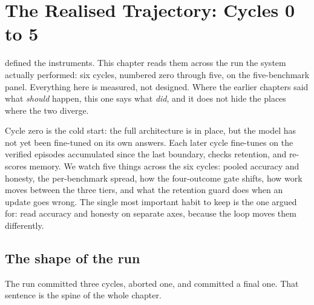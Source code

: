 \chapter{The Realised Trajectory: Cycles 0 to 5}
\label{ch:trajectory}

 defined the instruments. This chapter reads them across the run
the system actually performed: six cycles, numbered zero through five, on the
five-benchmark panel. Everything here is measured, not designed. Where the earlier
chapters said what \emph{should} happen, this one says what \emph{did}, and it does
not hide the places where the two diverge.

\begin{intuition}
Cycle zero is the cold start: the full architecture is in place, but the model has
not yet been fine-tuned on its own answers. Each later cycle fine-tunes on the
verified episodes accumulated since the last boundary, checks retention, and re-scores
memory. We watch five things across the six cycles: pooled accuracy and honesty, the
per-benchmark spread, how the four-outcome gate shifts, how work moves between the
three tiers, and what the retention guard does when an update goes wrong. The single
most important habit to keep is the one  argued for: read accuracy
and honesty on separate axes, because the loop moves them differently.
\end{intuition}

\section{The shape of the run}
\label{sec:traj-shape}

The run committed three cycles, aborted one, and committed a final one. That sentence
is the spine of the whole chapter.

